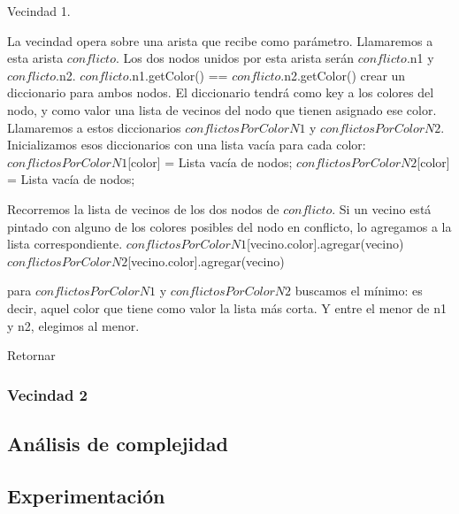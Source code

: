 \begin{algorithm}[H]
\caption{Vecindad 1.}
\label{vecindad1 pseudocode}
\begin{algorithmic}[1] 
\STATE La vecindad opera sobre una arista que recibe como parámetro. Llamaremos a esta arista $conflicto$. Los dos nodos unidos por esta arista serán $conflicto$.n1 y $conflicto$.n2.
\REQUIRE $conflicto$.n1.getColor() == $conflicto$.n2.getColor()
\STATE crear un diccionario para ambos nodos. El diccionario tendrá como key a los colores del nodo, y como valor una lista de vecinos del nodo que tienen asignado ese color. Llamaremos a estos diccionarios $conflictosPorColorN1$ y $conflictosPorColorN2$. Inicializamos esos diccionarios con una lista vacía para cada color:
    \STATE $conflictosPorColorN1$[color] = Lista vacía de nodos;  
\ENDFOR
{}
    \STATE $conflictosPorColorN2$[color] = Lista vacía de nodos;
\ENDFOR

\STATE Recorremos la lista de vecinos de los dos nodos de $conflicto$. Si un vecino está pintado con alguno de los colores posibles del nodo en conflicto, lo agregamos a la lista correspondiente.
	\STATE $conflictosPorColorN1$[vecino.color].agregar(vecino)
    \ENDIF
\ENDFOR
{}
	\STATE $conflictosPorColorN2$[vecino.color].agregar(vecino)
    \ENDIF
\ENDFOR

\STATE para $conflictosPorColorN1$ y $conflictosPorColorN2$ buscamos el mínimo: es decir, aquel color que tiene como valor la lista más corta. Y entre el menor de n1 y n2, elegimos al menor.

\STATE 




\STATE Retornar
\end{algorithmic}
\end{algorithm}
\leavevmode


\subsubsection{Vecindad 2}

\subsection{Análisis de complejidad}






\subsection{Experimentación}


